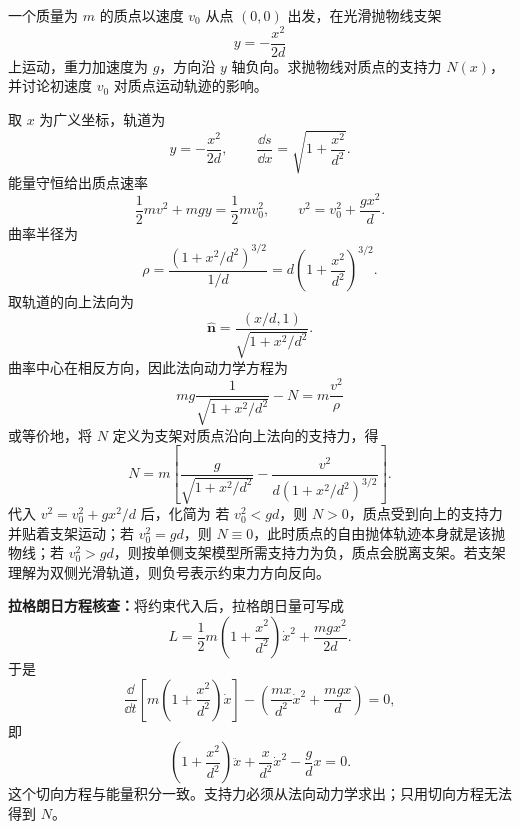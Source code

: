 \begin{question}[光滑抛物线支架上的质点]
一个质量为 $m$ 的质点以速度 $v_0$ 从点 $(0,0)$ 出发，在光滑抛物线支架
\[
  y=-\frac{x^2}{2d}
\]
上运动，重力加速度为 $g$，方向沿 $y$ 轴负向。求抛物线对质点的支持力 $N(x)$，并讨论初速度 $v_0$ 对质点运动轨迹的影响。

\begin{solution}
取 $x$ 为广义坐标，轨道为
\[
  y=-\frac{x^2}{2d},
  \qquad
  \frac{\dd s}{\dd x}=\sqrt{1+\frac{x^2}{d^2}}.
\]
能量守恒给出质点速率
\[
  \frac12mv^2+mgy=\frac12mv_0^2,
  \qquad
  v^2=v_0^2+\frac{gx^2}{d}.
\]
曲率半径为
\[
  \rho=\frac{\left(1+x^2/d^2\right)^{3/2}}{1/d}
  =d\left(1+\frac{x^2}{d^2}\right)^{3/2}.
\]
取轨道的向上法向为
\[
  \hat{\boldsymbol n}=\frac{(x/d,1)}{\sqrt{1+x^2/d^2}}.
\]
曲率中心在相反方向，因此法向动力学方程为
\[
  mg\frac{1}{\sqrt{1+x^2/d^2}}-N
  =m\frac{v^2}{\rho}
\]
或等价地，将 $N$ 定义为支架对质点沿向上法向的支持力，得
\[
  N=m\left[\frac{g}{\sqrt{1+x^2/d^2}}
  -\frac{v^2}{d(1+x^2/d^2)^{3/2}}\right].
\]
代入 $v^2=v_0^2+gx^2/d$ 后，化简为
若 $v_0^2<gd$，则 $N>0$，质点受到向上的支持力并贴着支架运动；若 $v_0^2=gd$，则 $N\equiv0$，此时质点的自由抛体轨迹本身就是该抛物线；若 $v_0^2>gd$，则按单侧支架模型所需支持力为负，质点会脱离支架。若支架理解为双侧光滑轨道，则负号表示约束力方向反向。


\medskip
\textbf{拉格朗日方程核查：}将约束代入后，拉格朗日量可写成
\[
  L=\frac12m\left(1+\frac{x^2}{d^2}\right)\dot x^2+\frac{mgx^2}{2d}.
\]
于是
\[
  \frac{\dd}{\dd t}\left[m\left(1+\frac{x^2}{d^2}\right)\dot x\right]
  -\left(\frac{mx}{d^2}\dot x^2+\frac{mgx}{d}\right)=0,
\]
即
\[
  \left(1+\frac{x^2}{d^2}\right)\ddot x+\frac{x}{d^2}\dot x^2-\frac{g}{d}x=0.
\]
这个切向方程与能量积分一致。支持力必须从法向动力学求出；只用切向方程无法得到 $N$。
\end{solution}

\end{question}

